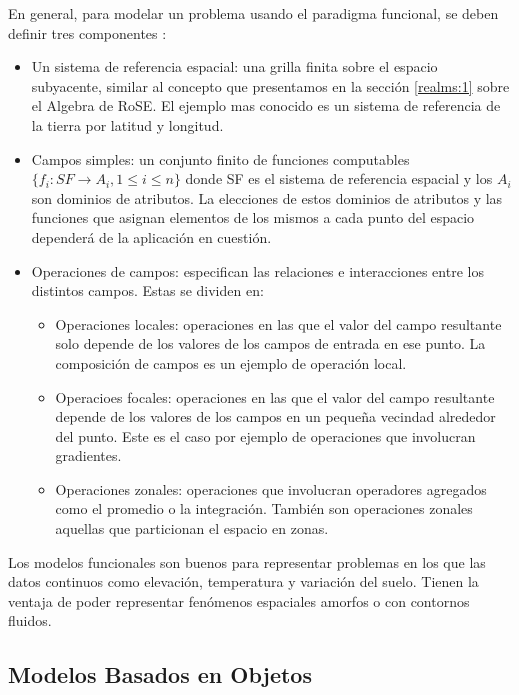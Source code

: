 En general, para modelar un problema usando el paradigma funcional, se deben definir tres componentes \cite{worboyz}:
\begin{itemize}
    \item Un sistema de referencia espacial: una grilla finita sobre el espacio subyacente,
    similar al concepto que presentamos en la sección \ref{realms:1} sobre el Algebra de RoSE.
    El ejemplo mas conocido es un sistema de referencia de la tierra por latitud y longitud.
    \item Campos simples: un conjunto finito de funciones computables $\{f_i: SF \rightarrow A_i, 1 \le i \le n\}$
    donde SF es el sistema de referencia espacial y los $A_i$ son dominios de atributos. La elecciones de estos dominios de atributos
    y las funciones que asignan elementos de los mismos a cada punto del espacio dependerá de la aplicación en cuestión.
    \item Operaciones de campos: especifican las relaciones e interacciones entre los distintos campos. Estas se dividen en:
    \begin{itemize}
        \item Operaciones locales: operaciones en las que el valor del campo resultante solo depende de los valores de los campos de entrada en ese punto.
        La composición de campos es un ejemplo de operación local.
        \item Operacioes focales: operaciones en las que el valor del campo resultante depende de los valores de los campos en un pequeña vecindad alrededor del punto.
        Este es el caso por ejemplo de operaciones que involucran gradientes.
        \item Operaciones zonales: operaciones que involucran operadores agregados como el promedio o la integración. También son operaciones
        zonales aquellas que particionan el espacio en zonas.
    \end{itemize}
\end{itemize}

Los modelos funcionales son buenos para representar problemas en los que las datos continuos
como elevación, temperatura y variación del suelo.
Tienen la ventaja de poder representar fenómenos espaciales amorfos o con contornos fluidos.

\subsection{Modelos Basados en Objetos}

